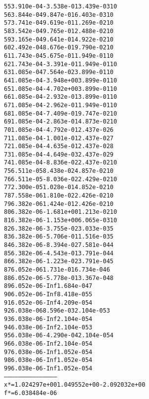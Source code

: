 \begin{alltt}
  55   3.910e-04  -3.538e-01   3.439e-03   10
  56   3.844e-04   9.847e-01   6.403e-03   10
  57   3.741e-04   9.619e-01   1.269e-02   10
  58   3.542e-04   9.765e-01   2.488e-02   10
  59   3.165e-04   9.641e-01   4.922e-02   10
  60   2.492e-04   8.676e-01   9.790e-02   10
  61   1.743e-04   5.675e-01   1.949e-01   10
  62   1.743e-04  -3.391e-01   1.949e-01   10
  63   1.085e-04   7.564e-02   3.899e-01   10
  64   1.085e-04  -3.948e+00   3.899e-01   10
  65   1.085e-04  -4.702e+00   3.899e-01   10
  66   1.085e-04  -2.932e-01   3.899e-01   10
  67   1.085e-04  -2.962e-01   1.949e-01   10
  68   1.085e-04  -7.409e-01   9.747e-02   10
  69   1.085e-04  -2.863e-01   4.873e-02   10
  70   1.085e-04  -4.792e-01   2.437e-02    6
  71   1.085e-04  -1.001e-01   2.437e-02    7
  72   1.085e-04  -4.635e-01   2.437e-02    8
  73   1.085e-04  -4.649e-03   2.437e-02    9
  74   1.085e-04  -8.836e-02   2.437e-02   10
  75   6.511e-05   8.438e-02   4.857e-02   10
  76   6.511e-05  -8.036e-02   2.429e-02   10
  77   2.300e-05   1.028e-01   4.852e-02   10
  78   7.558e-06   1.810e-02   2.426e-02   10
  79   6.382e-06   1.424e-01   2.426e-02   10
  80   6.382e-06  -1.681e+00   1.213e-02   10
  81   6.382e-06  -1.153e+00   6.065e-03   10
  82   6.382e-06  -3.755e-02   3.033e-03    5
  83   6.382e-06  -5.706e-01   1.516e-03    5
  84   6.382e-06  -8.394e-02   7.581e-04    4
  85   6.382e-06  -4.543e-01   3.791e-04    4
  86   6.382e-06  -1.223e-02   3.791e-04    5
  87   6.052e-06   1.731e-01   6.734e-04    6
  88   6.052e-06  -5.778e-01   3.367e-04    8
  89   6.052e-06        -Inf   1.684e-04    7
  90   6.052e-06        -Inf   8.418e-05    5
  91   6.052e-06        -Inf   4.209e-05    4
  92   6.038e-06   8.596e-03   2.104e-05    3
  93   6.038e-06        -Inf   2.104e-05    4
  94   6.038e-06        -Inf   2.104e-05    3
  95   6.038e-06  -4.290e-04   2.104e-05    4
  96   6.038e-06        -Inf   2.104e-05    4
  97   6.038e-06        -Inf   1.052e-05    4
  98   6.038e-06        -Inf   1.052e-05    4
  99   6.038e-06        -Inf   1.052e-05    4
---------------------------------------------
x* = 1.024297e+00  1.049552e+00  -2.092032e+00  
f* = 6.038484e-06
\end{alltt}
